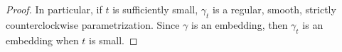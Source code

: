 \documentclass[11pt]{amsart}
\renewcommand{\leq}{\leqslant}
\theoremstyle{definition}
\theoremstyle{remark}
\numberwithin{equation}{section}
\begin{document}
\begin{proof}
		In particular, if $t$ is sufficiently small, $\gamma_t$ is a regular, smooth, strictly counterclockwise parametrization. 
		Since $\gamma$ is an embedding, then $\gamma_t$ is an embedding when $t$ is small. 

\end{proof}
\end{document}
